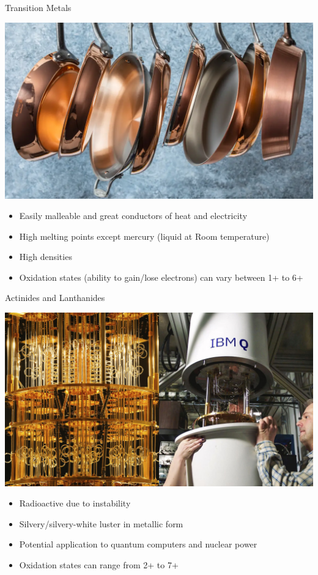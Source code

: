 \documentclass[11pt]{beamer}
\begin{document}
\begin{frame}{Transition Metals}
  \begin{center}
    \includegraphics[scale=0.12]{copper_pan}
  \end{center}
  
  \begin{itemize}
  \item Easily malleable and great conductors of heat and
    electricity
  \item High melting points except mercury (liquid at Room
    temperature)
  \item High densities
  \item Oxidation states (ability to gain/lose electrons) can
    vary between 1+ to 6+
  \end{itemize}
\end{frame}

\begin{frame}{Actinides and Lanthanides}
  \begin{center}
    \includegraphics[scale=0.3]{quantum_comp}
  \end{center}

  \begin{itemize}
  \item Radioactive due to instability
  \item Silvery/silvery-white luster in metallic form
  \item Potential application to quantum computers and
    nuclear power
  \item Oxidation states can range from 2+ to 7+
  \end{itemize}
\end{frame}
\end{document}
